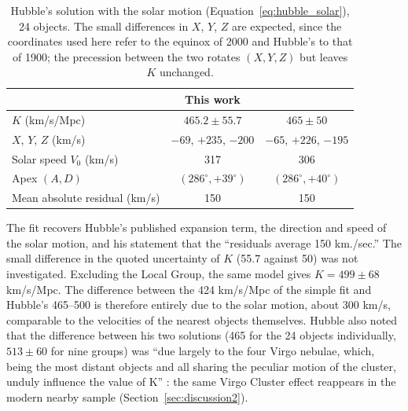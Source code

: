 \documentclass[11pt]{article}
\begin{document}
\begin{table}[htbp]
\centering
\begin{tabular}{lcc}
\toprule
 & This work & \citet{hubble1929} \\
\midrule
$K$ (km/s/Mpc) & $465.2 \pm 55.7$ & $465 \pm 50$ \\
$X$, $Y$, $Z$ (km/s) & $-69$, $+235$, $-200$ & $-65$, $+226$, $-195$ \\
Solar speed $V_0$ (km/s) & 317 & 306 \\
Apex $(A, D)$ & $(286^\circ, +39^\circ)$ & $(286^\circ, +40^\circ)$ \\
Mean absolute residual (km/s) & 150 & 150 \\
\bottomrule
\end{tabular}
\caption{Hubble's solution with the solar motion (Equation~\ref{eq:hubble_solar}), 24 objects. The small differences in $X$, $Y$, $Z$ are expected, since the coordinates used here refer to the equinox of 2000 and Hubble's to that of 1900; the precession between the two rotates $(X, Y, Z)$ but leaves $K$ unchanged.}
\label{tab:hubble_solar}
\end{table}

The fit recovers Hubble's published expansion term, the direction and speed of the solar motion, and his statement that the ``residuals average 150 km./sec.'' The small difference in the quoted uncertainty of $K$ (55.7 against 50) was not investigated. Excluding the Local Group, the same model gives $K = 499 \pm 68$ km/s/Mpc. The difference between the 424 km/s/Mpc of the simple fit and Hubble's 465--500 is therefore entirely due to the solar motion, about 300 km/s, comparable to the velocities of the nearest objects themselves. Hubble also noted that the difference between his two solutions (465 for the 24 objects individually, $513 \pm 60$ for nine groups) was ``due largely to the four Virgo nebulae, which, being the most distant objects and all sharing the peculiar motion of the cluster, unduly influence the value of K'' \citep{hubble1929}: the same Virgo Cluster effect reappears in the modern nearby sample (Section~\ref{sec:discussion2}).
\end{document}
